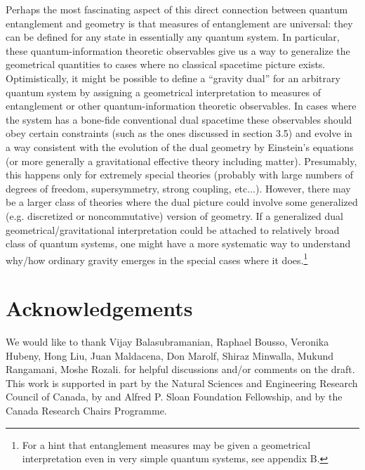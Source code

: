 \documentclass[12pt,epsf]{article}
\renewcommand{\(}{\left(}
\renewcommand{\)}{\right)}
\begin{document}
Perhaps the most fascinating aspect of this direct connection between quantum entanglement and geometry is that measures of entanglement are universal: they can be defined for any state in essentially any quantum system. In particular, these quantum-information theoretic observables give us a way to generalize the geometrical quantities to cases where no classical spacetime picture exists. Optimistically, it might be possible to define a ``gravity dual'' for an arbitrary quantum system by assigning a geometrical interpretation to measures of entanglement or other quantum-information theoretic observables. In cases where the system has a bone-fide conventional dual spacetime these observables should obey certain constraints (such as the ones discussed in section 3.5) and evolve in a way consistent with the evolution of the dual geometry by Einstein's equations (or more generally a gravitational effective theory including matter). Presumably, this happens only for extremely special theories (probably with large numbers of degrees of freedom, supersymmetry, strong coupling, etc...). However, there may be a larger class of theories where the dual picture could involve some generalized (e.g. discretized or noncommutative) version of geometry. If a generalized dual geometrical/gravitational interpretation could be attached to relatively broad class of quantum systems, one might have a more systematic way to understand why/how ordinary gravity emerges in the special cases where it does.\footnote{For a hint that entanglement measures may be given a geometrical interpretation even in very simple quantum systems, see appendix B.}


\section*{Acknowledgements}

We would like to thank Vijay Balasubramanian, Raphael Bousso, Veronika Hubeny, Hong Liu, Juan Maldacena, Don Marolf, Shiraz Minwalla, Mukund Rangamani, Moshe Rozali. for helpful discussions and/or comments on the draft. This work is supported in part by the Natural Sciences and Engineering Research Council of Canada, by and Alfred P. Sloan Foundation Fellowship, and by the Canada Research Chairs Programme.

\appendix
\end{document}
